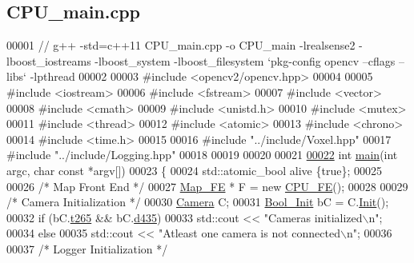 \hypertarget{CPU__main_8cpp_source}{}\subsection{C\+P\+U\+\_\+main.\+cpp}
\label{CPU__main_8cpp_source}

\begin{DoxyCode}
00001 \textcolor{comment}{// g++ -std=c++11 CPU\_main.cpp -o CPU\_main -lrealsense2 -lboost\_iostreams -lboost\_system -lboost\_filesystem
       `pkg-config opencv --cflags --libs` -lpthread}
00002 
00003 \textcolor{preprocessor}{#include <opencv2/opencv.hpp>}
00004 
00005 \textcolor{preprocessor}{#include <iostream>}
00006 \textcolor{preprocessor}{#include <fstream>}
00007 \textcolor{preprocessor}{#include <vector>}
00008 \textcolor{preprocessor}{#include <cmath>}
00009 \textcolor{preprocessor}{#include <unistd.h>}
00010 \textcolor{preprocessor}{#include <mutex>}
00011 \textcolor{preprocessor}{#include <thread>}
00012 \textcolor{preprocessor}{#include <atomic>}
00013 \textcolor{preprocessor}{#include <chrono>}
00014 \textcolor{preprocessor}{#include <time.h>}
00015 
00016 \textcolor{preprocessor}{#include "../include/Voxel.hpp"}
00017 \textcolor{preprocessor}{#include "../include/Logging.hpp"}
00018 
00019 
00020 
00021 
\hypertarget{CPU__main_8cpp_source.tex_l00022}{}\hyperlink{CPU__main_8cpp_abf9e6b7e6f15df4b525a2e7705ba3089}{00022} \textcolor{keywordtype}{int} \hyperlink{CPU__main_8cpp_abf9e6b7e6f15df4b525a2e7705ba3089}{main}(\textcolor{keywordtype}{int} argc, \textcolor{keywordtype}{char} \textcolor{keyword}{const} *argv[])
00023 \{
00024     std::atomic\_bool alive \{\textcolor{keyword}{true}\};
00025 
00026     \textcolor{comment}{/* Map Front End */}
00027     \hyperlink{classMap__FE}{Map\_FE} * F = \textcolor{keyword}{new} \hyperlink{classCPU__FE}{CPU\_FE}();
00028 
00029     \textcolor{comment}{/* Camera Initialization */}
00030     \hyperlink{classCamera}{Camera} C;
00031     \hyperlink{structBool__Init}{Bool\_Init} bC = C.\hyperlink{classCamera_a7f09b843d9b3a97e78eefcebbc53e054}{Init}();
00032     \textcolor{keywordflow}{if} (bC.\hyperlink{structBool__Init_a28c7d578113b5a52c1706c10be8fe6c6}{t265} && bC.\hyperlink{structBool__Init_a9b59846a335953ae88cad02cd9cf9b34}{d435})
00033         std::cout << \textcolor{stringliteral}{"Cameras initialized\(\backslash\)n"};
00034     \textcolor{keywordflow}{else} 
00035         std::cout << \textcolor{stringliteral}{"Atleast one camera is not connected\(\backslash\)n"};
00036 
00037     \textcolor{comment}{/* Logger Initialization */}

\end{DoxyCode}
